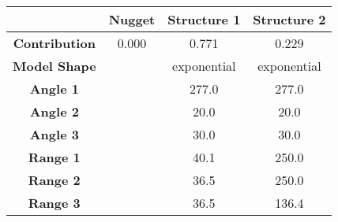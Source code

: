 \begin{tabular}{cccc}
\toprule
{} & Nugget &  Structure 1 &  Structure 2 \\
\midrule
\textbf{Contribution} &  0.000 &        0.771 &        0.229 \\
\textbf{Model Shape } &        &  exponential &  exponential \\
\textbf{Angle 1     } &        &        277.0 &        277.0 \\
\textbf{Angle 2     } &        &         20.0 &         20.0 \\
\textbf{Angle 3     } &        &         30.0 &         30.0 \\
\textbf{Range 1     } &        &         40.1 &        250.0 \\
\textbf{Range 2     } &        &         36.5 &        250.0 \\
\textbf{Range 3     } &        &         36.5 &        136.4 \\
\bottomrule
\end{tabular}
